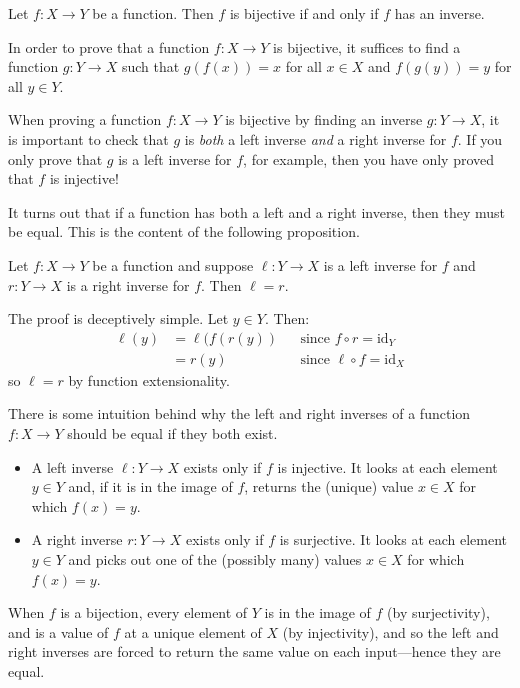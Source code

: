 \begin{exercise}
\label{exBijectiveIffHasInverse}
Let $f : X \to Y$ be a function. Then $f$ is bijective if and only if $f$ has an inverse.
\end{exercise}

\begin{strategy}
In order to prove that a function $f : X \to Y$ is bijective, it suffices to find a function $g : Y \to X$ such that $g(f(x)) = x$ for all $x \in X$ and $f(g(y)) = y$ for all $y \in Y$.
\end{strategy}

When proving a function $f : X \to Y$ is bijective by finding an inverse $g : Y \to X$, it is important to check that $g$ is \textit{both} a left inverse \textit{and} a right inverse for $f$. If you only prove that $g$ is a left inverse for $f$, for example, then you have only proved that $f$ is injective!

It turns out that if a function has both a left and a right inverse, then they must be equal. This is the content of the following proposition.

\begin{proposition}
\label{propLeftAndRightInversesAreEqual}
Let $f : X \to Y$ be a function and suppose $\ell : Y \to X$ is a left inverse for $f$ and $r : Y \to X$ is a right inverse for $f$. Then $\ell=r$.
\end{proposition}
\begin{cproof}
The proof is deceptively simple. Let $y \in Y$. Then:
\begin{align*}
\ell(y) &= \ell(f(r(y)) && \text{since } f \circ r = \mathrm{id}_Y \\
&= r(y) && \text{since } \ell \circ f = \mathrm{id}_X
\end{align*}
so $\ell = r$ by function extensionality.
\end{cproof}

There is some intuition behind why the left and right inverses of a function $f : X \to Y$ should be equal if they both exist.
\begin{itemize}
\item A left inverse $\ell : Y \to X$ exists only if $f$ is injective. It looks at each element $y \in Y$ and, if it is in the image of $f$, returns the (unique) value $x \in X$ for which $f(x)=y$.
\item A right inverse $r : Y \to X$ exists only if $f$ is surjective. It looks at each element $y \in Y$ and picks out one of the (possibly many) values $x \in X$ for which $f(x)=y$.
\end{itemize}
When $f$ is a bijection, every element of $Y$ is in the image of $f$ (by surjectivity), and is a value of $f$ at a unique element of $X$ (by injectivity), and so the left and right inverses are forced to return the same value on each input---hence they are equal.

